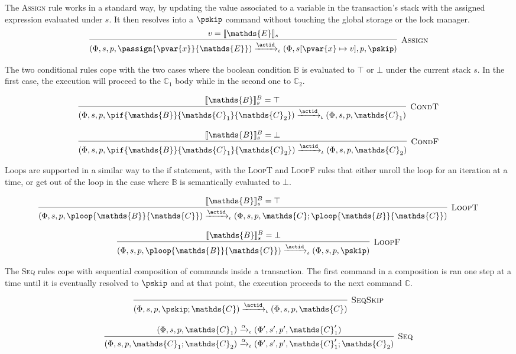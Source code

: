 The \textsc{Assign} rule works in a standard way, by updating the value associated to a variable in the transaction's stack with the assigned expression evaluated under $s$. It then resolves into a $\pskip$ command without touching the global storage or the lock manager.
\[
\infer[\textsc{Assign}]
{
	(\Phi, s, p, \passign{\pvar{x}}{\mathds{E}})
	\xrightarrow{\actid}_\iota
	(\Phi, s[\pvar{x} \mapsto v], p, \pskip)
}
{
	v = \llbracket \mathds{E} \rrbracket_s
}
\]

The two conditional rules cope with the two cases where the boolean condition $\mathds{B}$ is evaluated to $\top$ or $\bot$ under the current stack $s$. In the first case, the execution will proceed to the $\mathds{C}_1$ body while in the second one to $\mathds{C}_2$.

\[
\infer[\textsc{CondT}]
{
	(\Phi, s, p, \pif{\mathds{B}}{\mathds{C}_1}{\mathds{C}_2})
	\xrightarrow{\actid}_\iota
	(\Phi, s, p, \mathds{C}_1)
}
{
	\llbracket \mathds{B} \rrbracket_s^B = \top
}
\]

\[
\infer[\textsc{CondF}]
{
	(\Phi, s, p, \pif{\mathds{B}}{\mathds{C}_1}{\mathds{C}_2})
	\xrightarrow{\actid}_\iota
	(\Phi, s, p, \mathds{C}_2)
}
{
	\llbracket \mathds{B} \rrbracket_s^B = \bot
}
\]

Loops are supported in a similar way to the if statement, with the \textsc{LoopT} and \textsc{LoopF} rules that either unroll the loop for an iteration at a time, or get out of the loop in the case where $\mathds{B}$ is semantically evaluated to $\bot$.

\[
\infer[\textsc{LoopT}]
{
	(\Phi, s, p, \ploop{\mathds{B}}{\mathds{C}})
	\xrightarrow{\actid}_\iota
	(\Phi, s, p, \mathds{C}; \ploop{\mathds{B}}{\mathds{C}})
}
{
	\llbracket \mathds{B} \rrbracket_s^B = \top
}
\]

\[
\infer[\textsc{LoopF}]
{
	(\Phi, s, p, \ploop{\mathds{B}}{\mathds{C}})
	\xrightarrow{\actid}_\iota
	(\Phi, s, p, \pskip)
}
{
	\llbracket \mathds{B} \rrbracket_s^B = \bot
}
\]

The \textsc{Seq} rules cope with sequential composition of commands inside a transaction. The first command in a composition is ran one step at a time until it is eventually resolved to $\pskip$ and at that point, the execution proceeds to the next command $\mathds{C}$.

\[
\infer[\textsc{SeqSkip}]
{
	(\Phi, s, p, \pskip ; \mathds{C})
	\xrightarrow{\actid}_\iota
	(\Phi, s, p, \mathds{C})
}
{}
\]

\[
\infer[\textsc{Seq}]
{
	(\Phi, s, p, \mathds{C}_1 ; \mathds{C}_2)
	\xrightarrow{\alpha}_\iota
	(\Phi', s', p', \mathds{C}_1' ; \mathds{C}_2)
}
{
	(\Phi, s, p, \mathds{C}_1)
	\xrightarrow{\alpha}_\iota
	(\Phi', s', p', \mathds{C}_1')
}
\]

